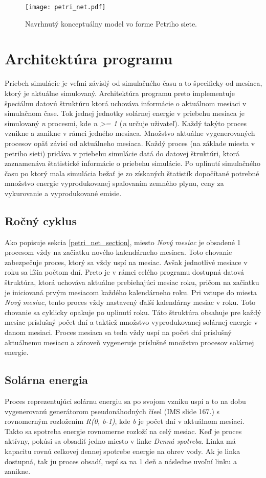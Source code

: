 \documentclass[a4paper, 11pt]{article}
\begin{document}
\begin{figure}[h] 
	\centering
	\texttt{[image: petri\_net.pdf]}
	\caption{Navrhnutý konceptuálny model vo forme Petriho siete.}
	\label{obr1}
\end{figure} \label{obr_petri_net}

\section{Architektúra programu}
Priebeh simulácie je veľmi závislý od simulačného času a to špecificky od mesiaca, ktorý je aktuálne simulovaný. Architektúra programu preto implementuje špeciálnu datovú štruktúru ktorá uchováva informácie o aktuálnom mesiaci v simulačnom čase. Tok jednej jednotky solárnej energie v priebehu mesiaca je simulovaný \textit{n} procesmi, kde \textit{n >= 1} (\textit{n} určuje uživateľ). Každý takýto proces vznikne a zanikne v rámci jedného mesiaca. Množstvo aktuálne vygenerovaných procesov opäť závisí od aktuálneho mesiaca. Každý proces (na základe miesta v petriho sieti) pridáva v priebehu simulácie datá do datovej štruktúri, ktorá zaznamenáva štatistické informácie o priebehu simulácie. Po uplinutí simulačného času po ktorý mala simulácia bežať je zo získaných štatistík dopočítané potrebné množstvo energie vyprodukovanej spaľovaním zemného plynu, ceny za vykurovanie a vyprodukované emisie.

\subsection{Ročný cyklus}
Ako popisuje sekcia \ref{petri_net_section}, miesto \textit{Nový mesiac} je obsadené 1 procesom vždy na začiatku nového kalendárneho mesiaca. Toto chovanie zabezpečuje proces, ktorý sa vždy uspí na mesiac. Avšak jednotlivé mesiace v roku sa líšia počtom dní. Preto je v rámci celého programu dostupná datová štruktúra, ktorá uchováva aktuálne prebiehajúci mesiac roku, pričom na začiatku je iniciovaná prvým mesiacom každého kalendárneho roku. Pri vstupe do miesta \textit{Nový mesiac}, tento proces vždy nastavený ďalší kalendárny mesiac v roku. Toto chovanie sa cyklicky opakuje po uplinutí roku. Táto štruktúra obsahuje pre každý mesiac príslušný počet dní a taktiež množstvo vyprodukovanej solárnej energie v danom mesiaci. Proces mesiaca sa teda vždy uspí na počet dní príslušný aktuálnemu mesiacu a zároveň vygeneruje príslušné množstvo procesov solárnej energie.

\subsection{Solárna energia}\label{solar_energy_proces}
Proces reprezentujúci solárnu energiu sa po svojom vzniku uspí a to na dobu vygenerovanú generátorom pseudonáhodných čísel (IMS\cite{ims_slides} slide 167.) s rovnomerným rozložením \textit{R(0, b-1)}, kde \textit{b} je počet dní v aktuálnom mesiaci. Takto sa spotreba energie rovnomerne rozloží na celý mesiac. Keď je proces aktívny, pokúsi sa obsadiť jedno miesto v linke \textit{Denná spotreba}. Linka má kapacitu rovnú celkovej dennej spotrebe energie na ohrev vody. Ak je linka dostupná, tak ju proces obsadí, uspí sa na 1 deň a následne uvoľní linku a zanikne.
\end{document}

